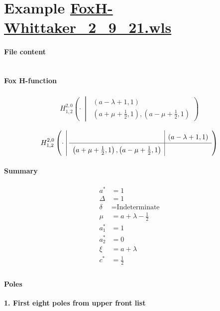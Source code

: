 \documentclass[11pt]{article}
\newcommand{\FoxH}[5]{H_{#2}^{#1}\left(#3\:\middle\vert\: \begin{array}{l}#4\\[0.4em] #5\end{array}\right)}
\begin{document}
\section{Example \url{FoxH-Whittaker_2_9_21.wls}}

\paragraph{File content}

\inputminted{text}{FoxH-Whittaker_2_9_21.wls}

\paragraph{Fox H-function}

\begin{align*}
  \FoxH
    {2,0}
    {1,2}
    {\cdot}
    {\left(a-\lambda +1, 1\right)}
    {\left(a+\mu +\frac{1}{2}, 1\right), \left(a-\mu +\frac{1}{2}, 1\right)}
\end{align*}

\begin{align*}
  \FoxHext
    {2,0}
    {1,2}
    {\cdot}
    {}
    {\left(a-\lambda +1, 1\right)}
    {\left(a+\mu +\frac{1}{2}, 1\right), \left(a-\mu +\frac{1}{2}, 1\right)}
    {}
\end{align*}

\paragraph{Summary}

\begin{align*}
  a^*    & = 1 \\
  \Delta & = 1 \\
  \delta & = \text{Indeterminate} \\
  \mu    & = a+\lambda -\frac{1}{2} \\
  a_1^*  & = 1 \\
  a_2^*  & = 0 \\
  \xi    & = a+\lambda \\
  c^*    & = \frac{1}{2} \\
\end{align*}

\paragraph{Poles}

\noindent\textbf{1. First eight poles from upper front list}
\end{document}
